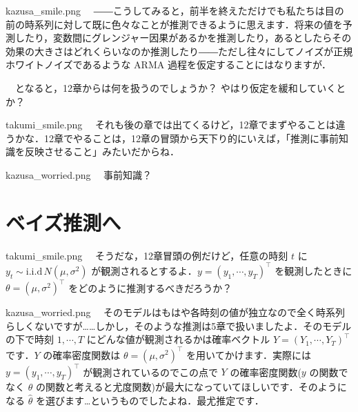 \documentclass[b5paper,xelatex,ja=standard,10pt]{bxjsarticle}
\begin{document}
\begin{SERIFU}[colback=PaleIris,colbacktitle=PaleIris2]{kazusa_smile.png}
　――こうしてみると，前半を終えただけでも私たちは目の前の時系列に対して既に色々なことが推測できるように思えます．将来の値を予測したり，変数間にグレンジャー因果があるかを推測したり，あるとしたらその効果の大きさはどれくらいなのか推測したり――ただし往々にしてノイズが正規ホワイトノイズであるような ARMA 過程を仮定することにはなりますが．

　となると，12章からは何を扱うのでしょうか？ やはり仮定を緩和していくとか？
\end{SERIFU}


\begin{SERIFU}[colback=PaleGold,colbacktitle=PaleGold2]{takumi_smile.png}
　それも後の章では出てくるけど，12章でまずやることは違うかな．12章でやることは，12章の冒頭から天下り的にいえば，{「推測に事前知識を反映させること」}みたいだからね．
\end{SERIFU}


\begin{SERIFU}[colback=PaleIris,colbacktitle=PaleIris2]{kazusa_worried.png}
　事前知識？
\end{SERIFU}


\section*{ベイズ推測へ}
\vspace{3pt}


\begin{SERIFU}[colback=PaleGold,colbacktitle=PaleGold2]{takumi_smile.png}
　そうだな，12章冒頭の例だけど，任意の時刻 $t$ に $y_t \sim \mathrm{i.i.d} \, N(\mu, \sigma^2)$ が観測されるとするよ．$y = (y_1, \cdots, y_T)^\top$ を観測したときに $\theta = (\mu, \sigma^2)^\top$ をどのように推測するべきだろうか？
\end{SERIFU}


\begin{SERIFU}[colback=PaleIris,colbacktitle=PaleIris2]{kazusa_worried.png}
　そのモデルはもはや各時刻の値が独立なので全く時系列らしくないですが……しかし，そのような推測は5章で扱いましたよ．そのモデルの下で時刻 $1, \cdots, T$ にどんな値が観測されるかは確率ベクトル $Y = (Y_1, \cdots, Y_T)^\top$ です．$Y$ の確率密度関数は $\theta = (\mu, \sigma^2)^\top$ を用いてかけます．実際には $y = (y_1, \cdots, y_T)^\top$ が観測されているのでこの点で $Y$ の確率密度関数($y$ の関数でなく $\theta$ の関数と考えると尤度関数)が最大になっていてほしいです．そのようになる $\hat{\theta}$ を選びます…というものでしたよね．最尤推定です．
\end{SERIFU}
\end{document}
